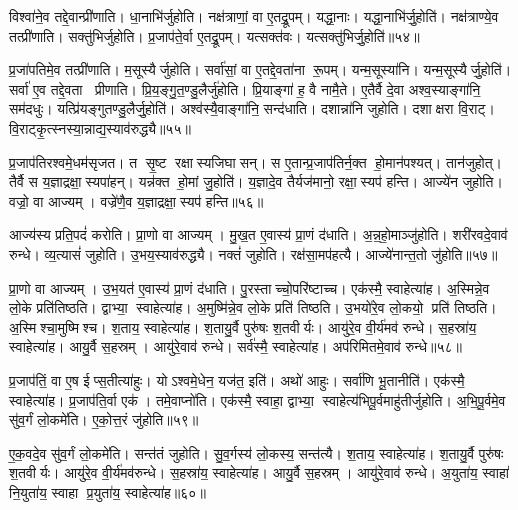 विश्वा॑ने॒व तद्दे॒वान्प्री॑णाति।
धा॒नाभि॑र्जुहोति।
नक्ष॑त्राणां॒ वा ए॒तद्रू॒पम्।
यद्धा॒नाः।
यद्धा॒नाभि॑र्जु॒होति॑।
नक्ष॑त्राण्ये॒व तत्प्री॑णाति।
सक्तु॑भिर्जुहोति।
प्र॒जाप॑ते॒र्वा ए॒तद्रू॒पम्।
यत्सक्त॑वः।
यत्सक्तु॑भिर्जु॒होति॑॥५४॥

प्र॒जा॑पतिमे॒व तत्प्री॑णाति।
म॒सूस्यैर्जुहोति।
सर्वा॑सां॒ वा ए॒तद्दे॒वता॑ना रू॒पम्।
यन्म॒सूस्या॑नि।
यन्म॒सूस्यैर्जु॒होति॑।
सर्वा॑ ए॒व तद्दे॒वता प्रीणाति।
प्रि॒य॒ङ्गु॒त॒ण्डु॒लैर्जु॑होति।
प्रि॒याङ्गा॑ ह॒ वै नामै॒ते।
ए॒तैर्वै दे॒वा अश्व॒स्याङ्गा॑नि॒ सम॑दधुः।
यत्प्रि॑यङ्गुतण्डु॒लैर्जु॒होति॑।
अश्व॑स्यै॒वाङ्गा॑नि॒ सन्द॑धाति।
दशान्ना॑नि जुहोति।
दशाक्षरा वि॒राट्।
वि॒राट्कृ॒त्स्नस्या॒न्नाद्य॒स्याव॑रुद्ध्यै॥५५॥\anuvakamend[जु॒होति॒ मधु॑ना जु॒होति॒ पृथु॑कैर्जु॒होति॑ क॒रम्बैर्जु॒होति॒ सक्तु॑भिर्जु॒होति॑ प्रियङ्गुतण्डु॒लैर्जु॒होति॑ च॒त्वारि॑ च (अ॒न्नहो॒मानाज्ये॑ना॒ग्नेर्मधु॑ना तण़्डु॒लैः पृथु॑कैर्ला॒जैः क॒रम्बैर्धा॒नाभि॒ सक्तु॑भिर्म॒सूस्यै प्रियङ्गुतण्डु॒लैर्द॒शान्ना॑नि॒ द्वाद॑श।
)]

प्र॒जाप॑तिरश्वमे॒धम॑सृजत।
त सृ॒ष्ट रक्षास्यजिघासन्।
स ए॒तान्प्र॒जाप॑तिर्न॒क्त हो॒मान॑पश्यत्।
तान॑जुहोत्।
तैर्वै स य॒ज्ञाद्रक्षा॒स्यपा॑हन्।
यन्न॑क्त हो॒मां जु॒होति॑।
य॒ज्ञादे॒व तैर्यज॑मानो॒ रक्षा॒स्यप॑ हन्ति।
आज्ये॑न जुहोति।
वज्रो॒ वा आज्यम्।
वज्रे॑णै॒व य॒ज्ञाद्रक्षा॒स्यप॑ हन्ति॥५६॥

आज्य॑स्य प्रति॒पदं॑ करोति।
प्रा॒णो वा आज्यम्।
मु॒ख॒त ए॒वास्य॑ प्रा॒णं द॑धाति।
अ॒न्न॒हो॒माञ्जु॑होति।
शरी॑रवदे॒वाव॑ रुन्धे।
व्य॒त्यासं॑ जुहोति।
उ॒भय॒स्याव॑रुद्ध्यै।
नक्तं॑ जुहोति।
रक्ष॑सा॒मप॑हत्यै।
आज्ये॑नान्त॒तो जु॑होति॥५७॥

प्रा॒णो वा आज्यम्।
उ॒भ॒यत॑ ए॒वास्य॑ प्रा॒णं द॑धाति।
पु॒रस्ताच्चो॒परि॑ष्टाच्च।
एक॑स्मै॒ स्वाहेत्या॑ह।
अ॒स्मिन्ने॒व लो॒के प्रति॑तिष्ठति।
द्वाभ्या॒ स्वाहेत्या॑ह।
अ॒मुष्मि॑न्ने॒व लो॒के प्रति॑ तिष्ठति।
उ॒भयो॑रे॒व लो॒कयो॒ प्रति॑ तिष्ठति।
अ॒स्मिश्चा॒मुष्मिश्च।
श॒ताय॒ स्वाहेत्या॑ह।
श॒तायु॒र्वै पुरु॑षः श॒तवीर्यः।
आयु॑रे॒व वी॒र्य॑मव॑ रुन्धे।
स॒हस्रा॑य॒ स्वाहेत्या॑ह।
आयु॒र्वै स॒हस्रम्।
आयु॑रे॒वाव॑ रुन्धे।
सर्व॑स्मै॒ स्वाहेत्या॑ह।
अप॑रिमितमे॒वाव॑ रुन्धे॥५८॥\anuvakamend[ए॒व य॒ज्ञाद्रक्षा॒स्यप॑हन्त्यन्त॒तो जु॑होति श॒ताय॒ स्वाहेत्या॑ह स॒प्त च॑]

प्र॒जाप॑तिं॒ वा ए॒ष ईप्स॒तीत्या॑हुः।
योऽश्वमे॒धेन॒ यज॑त॒ इति॑।
अथो॑ आहुः।
सर्वा॑णि भू॒तानीति॑।
एक॑स्मै॒ स्वाहेत्या॑ह।
प्र॒जाप॑ति॒र्वा एक॑।
तमे॒वाप्नो॑ति।
एक॑स्मै॒ स्वाहा॒ द्वाभ्या॒ स्वाहेत्य॑भिपू॒र्वमाहु॑तीर्जुहोति।
अ॒भि॒पू॒र्वमे॒व सु॑व॒र्गं लो॒कमे॑ति।
ए॒को॒त्त॒रं जु॑होति॥५९॥

ए॒क॒वदे॒व सु॑व॒र्गं लो॒कमे॑ति।
सन्त॑तं जुहोति।
सु॒व॒र्गस्य॑ लो॒कस्य॒ सन्त॑त्यै।
श॒ताय॒ स्वाहेत्या॑ह।
श॒तायु॒र्वै पुरु॑षः श॒तवीर्यः।
आयु॑रे॒व वी॒र्य॑मव॑रुन्धे।
स॒हस्रा॑य॒ स्वाहेत्या॑ह।
आयु॒र्वै स॒हस्रम्।
आयु॑रे॒वाव॑ रुन्धे।
अ॒युता॑य॒ स्वाहा॑ नि॒युता॑य॒ स्वाहा प्र॒युता॑य॒ स्वाहेत्या॑ह॥६०॥

